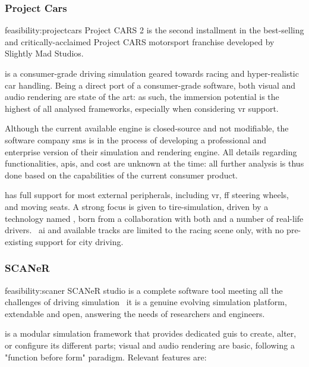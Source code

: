 \subsubsection{Project Cars}

\begin{excerpt}{feasibility:projectcars}
    Project CARS 2 is the second installment in the best-selling and critically-acclaimed Project CARS motorsport franchise developed by Slightly Mad Studios.
\end{excerpt}

 is a consumer-grade driving simulation geared towards racing and hyper-realistic car handling. Being a direct port of a consumer-grade software, both visual and audio rendering are state of the art: as such, the immersion potential is the highest of all analysed \glspl{framework}, especially when considering \gls{vr} support.

Although the current available engine is closed-source and not modifiable, the software company \gls{sms} is in the process of developing a professional and enterprise version of their simulation and rendering engine. All details regarding functionalities, \glspl{api}, and cost are unknown at the time: all further analysis is thus done based on the capabilities of the current consumer product.

 has full support for most external peripherals, including \gls{vr}, \gls{ff} steering wheels, and moving seats. A strong focus is given to tire-simulation, driven by a technology named , born from a collaboration with both  and a number of real-life drivers.~\cite{feasibility:projectcarstires} \gls{ai} and available tracks are limited to the racing scene only, with no pre-existing support for city driving.

\subsubsection{SCANeR}

\begin{excerpt}{feasibility:scaner}
SCANeR studio is a complete software tool meeting all the challenges of driving simulation \CHARomissis\ it is a genuine evolving simulation platform, extendable and open, answering the needs of researchers and engineers.
\end{excerpt}

 is a modular simulation \gls{framework} that provides dedicated \glspl{gui} to create, alter, or configure its different parts; visual and audio rendering are basic, following a "function before form" paradigm. Relevant \glspl{feature} are:

